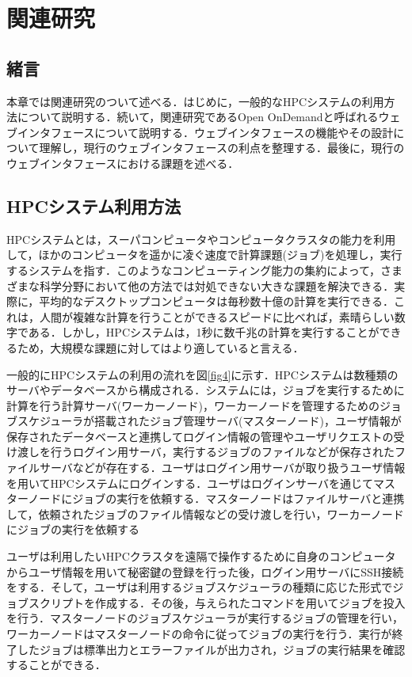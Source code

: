 
\section{関連研究}

\subsection{緒言}
本章では関連研究のついて述べる．はじめに，一般的なHPCシステムの利用方法について説明する．続いて，関連研究であるOpen OnDemandと呼ばれるウェブインタフェースについて説明する．ウェブインタフェースの機能やその設計について理解し，現行のウェブインタフェースの利点を整理する．最後に，現行のウェブインタフェースにおける課題を述べる．

\subsection{HPCシステム利用方法}
HPCシステムとは，スーパコンピュータやコンピュータクラスタの能力を利用して，ほかのコンピュータを遥かに凌ぐ速度で計算課題(ジョブ)を処理し，実行するシステムを指す．このようなコンピューティング能力の集約によって，さまざまな科学分野において他の方法では対処できない大きな課題を解決できる．実際に，平均的なデスクトップコンピュータは毎秒数十億の計算を実行できる．これは，人間が複雑な計算を行うことができるスピードに比べれば，素晴らしい数字である．しかし，HPCシステムは，1秒に数千兆の計算を実行することができるため，大規模な課題に対してはより適していると言える．\par
一般的にHPCシステムの利用の流れを図\ref{fig4}に示す．HPCシステムは数種類のサーバやデータベースから構成される．システムには，ジョブを実行するために計算を行う計算サーバ(ワーカーノード)，ワーカーノードを管理するためのジョブスケジューラが搭載されたジョブ管理サーバ(マスターノード)，ユーザ情報が保存されたデータベースと連携してログイン情報の管理やユーザリクエストの受け渡しを行うログイン用サーバ，実行するジョブのファイルなどが保存されたファイルサーバなどが存在する．ユーザはログイン用サーバが取り扱うユーザ情報を用いてHPCシステムにログインする．ユーザはログインサーバを通じてマスターノードにジョブの実行を依頼する．マスターノードはファイルサーバと連携して，依頼されたジョブのファイル情報などの受け渡しを行い，ワーカーノードにジョブの実行を依頼する\par
ユーザは利用したいHPCクラスタを遠隔で操作するために自身のコンピュータからユーザ情報を用いて秘密鍵の登録を行った後，ログイン用サーバにSSH接続をする．そして，ユーザは利用するジョブスケジューラの種類に応じた形式でジョブスクリプトを作成する．その後，与えられたコマンドを用いてジョブを投入を行う．マスターノードのジョブスケジューラが実行するジョブの管理を行い，ワーカーノードはマスターノードの命令に従ってジョブの実行を行う．実行が終了したジョブは標準出力とエラーファイルが出力され，ジョブの実行結果を確認することができる．\par

